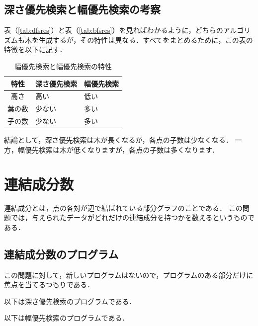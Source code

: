 \documentclass[a4j, titlepage]{jarticle}
\begin{document}
    \subsection{深さ優先検索と幅優先検索の考察}
    表（\ref{tab:dfsres}）と表（\ref{tab:bfsres}）を見ればわかるように，どちらのアルゴリズムも木を生成するが，その特性は異なる．すべてをまとめるために，この表の特徴を以下に記す．

    \begin{longtable}[c]{|c|l|l|}
        \caption{幅優先検索と幅優先検索の特性}
        \label{tab:characteristic}\\
        \hline
        \rowcolor[HTML]{C0C0C0} 
        \cellcolor[HTML]{C0C0C0}特性 & \multicolumn{1}{c|}{\cellcolor[HTML]{C0C0C0}深さ優先検索} & \multicolumn{1}{c|}{\cellcolor[HTML]{C0C0C0}幅優先検索} \\ \hline
        \endfirsthead
        \endhead
        高さ        & 高い    & 低い          \\ \hline
        葉の数       & 少ない   & 多い          \\ \hline
        子の数       & 少ない   & 多い          \\ \hline
    \end{longtable}

    結論として，深さ優先検索は木が長くなるが，各点の子数は少なくなる．
    一方，幅優先検索は木が低くなりますが，各点の子数は多くなります．

\vspace{30pt}
    
\section{連結成分数}
連結成分とは，点の各対が辺で結ばれている部分グラフのことである．
この問題では，与えられたデータがどれだけの連結成分を持つかを数えるというものである．
    
    \subsection{連結成分数のプログラム}
    この問題に対して，新しいプログラムはないので，プログラムのある部分だけに焦点を当てるつもりである．

    以下は深さ優先検索のプログラムである．
     

    以下は幅優先検索のプログラムである．
     
    
\end{document}
